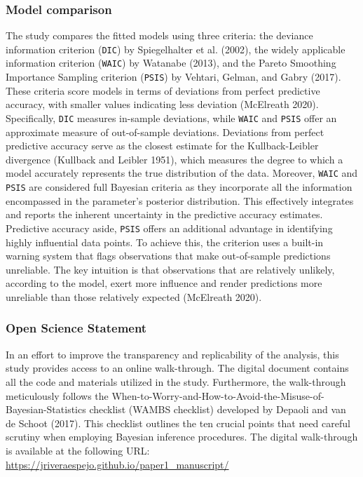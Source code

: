 \documentclass[
sn-apacite
]{sn-jnl}
\begin{document}
\subsubsection{Model comparison}\label{sec-M-SM-MC}

The study compares the fitted models using three criteria: the deviance
information criterion (\texttt{DIC}) by Spiegelhalter et al. (2002), the
widely applicable information criterion (\texttt{WAIC}) by Watanabe
(2013), and the Pareto Smoothing Importance Sampling criterion
(\texttt{PSIS}) by Vehtari, Gelman, and Gabry (2017). These criteria
score models in terms of deviations from perfect predictive accuracy,
with smaller values indicating less deviation (McElreath 2020).
Specifically, \texttt{DIC} measures in-sample deviations, while
\texttt{WAIC} and \texttt{PSIS} offer an approximate measure of
out-of-sample deviations. Deviations from perfect predictive accuracy
serve as the closest estimate for the Kullback-Leibler divergence
(Kullback and Leibler 1951), which measures the degree to which a model
accurately represents the true distribution of the data. Moreover,
\texttt{WAIC} and \texttt{PSIS} are considered full Bayesian criteria as
they incorporate all the information encompassed in the parameter's
posterior distribution. This effectively integrates and reports the
inherent uncertainty in the predictive accuracy estimates. Predictive
accuracy aside, \texttt{PSIS} offers an additional advantage in
identifying highly influential data points. To achieve this, the
criterion uses a built-in warning system that flags observations that
make out-of-sample predictions unreliable. The key intuition is that
observations that are relatively unlikely, according to the model, exert
more influence and render predictions more unreliable than those
relatively expected (McElreath 2020).

\subsubsection{Open Science Statement}\label{sec-M-SM-OS}

In an effort to improve the transparency and replicability of the
analysis, this study provides access to an online walk-through. The
digital document contains all the code and materials utilized in the
study. Furthermore, the walk-through meticulously follows the
When-to-Worry-and-How-to-Avoid-the-Misuse-of-Bayesian-Statistics
checklist (WAMBS checklist) developed by Depaoli and van de Schoot
(2017). This checklist outlines the ten crucial points that need careful
scrutiny when employing Bayesian inference procedures. The digital
walk-through is available at the following {URL}:
\url{https://jriveraespejo.github.io/paper1_manuscript/}
\end{document}
